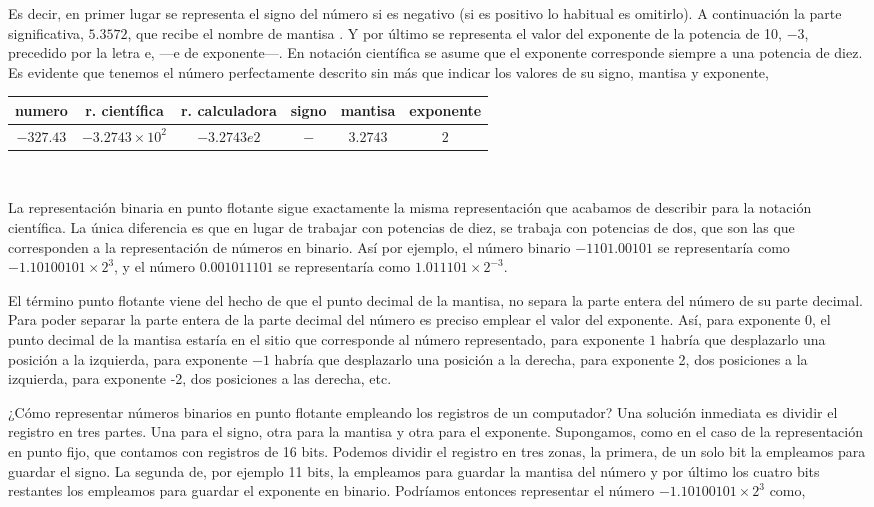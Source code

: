 \begin{paracol}{2}
Es decir, en primer lugar se representa el signo del número si es negativo (si es positivo lo habitual es omitirlo). A continuación la parte significativa, $5.3572$, que recibe el nombre de mantisa  . Y por último se representa el valor del exponente de la potencia de 10, $-3$, precedido por la letra e, ---e de exponente---. En notación científica se asume que el exponente corresponde siempre a una potencia de diez. Es evidente que tenemos el número perfectamente descrito sin más que indicar los valores de su signo, mantisa y exponente,\\
\end{paracol}

\begin{tabular}{|c||c||c||c|c|c|}
\hline
numero&r. científica&r. calculadora&signo&mantisa&exponente\\
\hline
$-327.43$&$-3.2743\times 10^2$&$-3.2743e2$&$-$&$3.2743$&$2$\\
\hline
\end{tabular}\\

\begin{paracol}{2}
La representación binaria en punto flotante sigue exactamente la misma representación que acabamos de describir para la notación científica. La única diferencia es que en lugar de trabajar con potencias de diez, se trabaja con potencias de dos, que son las que corresponden a la representación de números en binario.  Así por ejemplo, el número binario $-1101.00101$ se representaría como $-1.10100101\times 2^3$, y el número $0.001011101$ se representaría como $1.011101\times 2^{-3}$. 

El término punto flotante viene del hecho de que el punto decimal de la mantisa, no separa la parte entera del número de su parte decimal. Para poder separar la parte entera de la parte decimal del número es preciso emplear el valor del exponente. Así, para exponente $0$, el punto decimal de la mantisa estaría en el sitio que corresponde al número representado, para exponente $1$ habría que desplazarlo una posición a la izquierda, para exponente $-1$ habría que desplazarlo una posición a la derecha, para exponente 2, dos posiciones a la izquierda, para exponente -2, dos posiciones a las derecha, etc.

¿Cómo representar números binarios en punto flotante empleando los registros de un computador? Una solución inmediata es dividir el registro en tres partes. Una para el signo, otra para la mantisa y otra para el exponente. Supongamos, como en el caso de la representación en punto fijo, que contamos con registros de 16 bits.  Podemos dividir el registro en tres zonas, la primera, de un solo bit la empleamos para guardar el signo. La segunda de, por ejemplo 11 bits, la empleamos para guardar la mantisa del número y por último los cuatro bits restantes los empleamos para guardar el exponente en binario. Podríamos entonces representar el número  $-1.10100101\times 2^3$ como,
\end{paracol}

